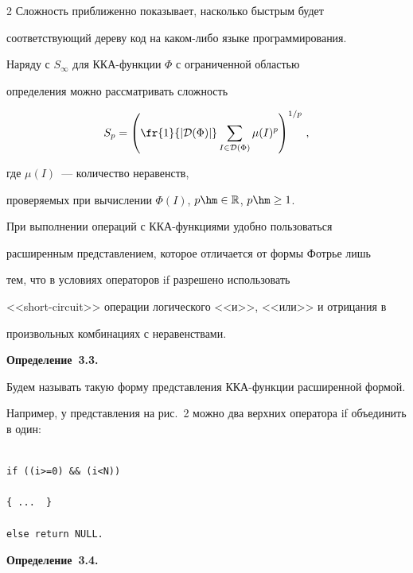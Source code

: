 \begin{multicols}{2}
Сложность приближенно показывает, насколько быстрым будет

соответствующий дереву код на ка\-ком-ли\-бо языке программирования.

Наряду с $S_\infty$ для ККА-функции $\Phi$ с ограниченной областью

определения можно рассматривать сложность 

$$

S_p=\left(\fr{1}{|{\cal D}(\Phi)|} \sum\limits_{I\in{\cal D}(\Phi)} \mu(I)^p

\right)^{1/p}\,,

$$ 

где $\mu(I)$~--- количество неравенств,

проверяемых при вычислении $\Phi(I)$, $p\hm\in\mathbb{R}$, $p\hm\geq1$.



При выполнении операций с ККА-функциями удобно пользоваться

расширенным представлением, которое отличается от формы Фотрье лишь

тем, что в условиях операторов if разрешено использовать

<<short-circuit>> операции логического <<и>>, <<или>> и отрицания в

произвольных комбинациях с неравенствами.



\smallskip



\noindent

\textbf{Определение~3.3.}

Будем называть такую форму представления ККА-функции расширенной формой.



\smallskip



Например, у представления на рис.~2 можно два верхних оператора if объединить в один:

\begin{verbatim}

if ((i>=0) && (i<N))

{ ...  }

else return NULL.

\end{verbatim}



\smallskip



\noindent

\textbf{Определение~3.4.}


\end{multicols}
